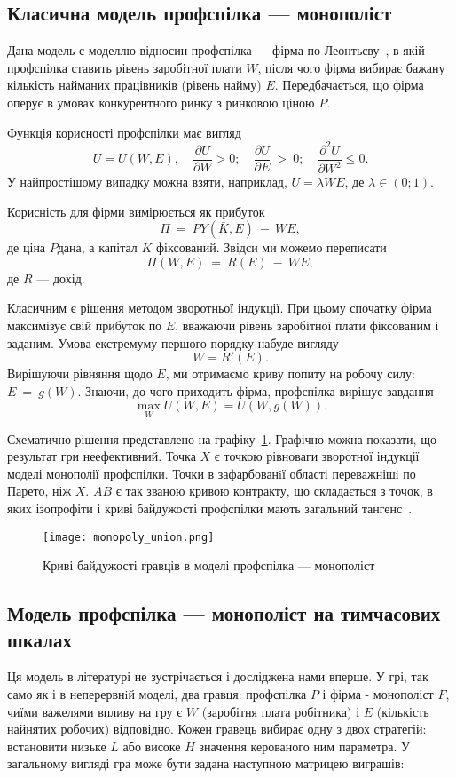 \subsection{Класична модель профспілка --- монополіст}
\label{sec:monopoly}

Дана модель є моделлю відносин профспілка --- фірма по
Леонтьєву~\cite{LeontiefW}, в якій профспілка ставить рівень заробітної плати $ W $,
після чого фірма вибирає бажану кількість найманих працівників (рівень
найму) $ E $. Передбачається, що фірма оперує в умовах конкурентного ринку з
ринковою ціною $ P $.

Функція корисності профспілки має вигляд
$$ 
	U = U(W,E), 
	\quad 
		\frac{\partial U}{\partial W} > 0; 
	\quad 
		\frac{\partial U}{\partial E}~>~0;
	\quad   
		\frac{\partial^2 U}{\partial W^2} \leqslant 0.
$$ 
У найпростішому випадку можна взяти, наприклад, $U = \lambda WE$, де $\lambda \in (0; 1)$.

Корисність для фірми вимірюється як прибуток
$$
	\Pi~=~PY(\bar K,E)~-~WE,
$$ 
де ціна $P$дана, а капітал $\bar K$ фіксований. Звідси ми можемо переписати 
$$
	\Pi(W,E)~=~R(E)~-~WE,
$$ 
де $R$ --- дохід.

Класичним є рішення методом зворотньої індукції.
При цьому спочатку фірма максимізує свій прибуток по $ E $, вважаючи рівень
заробітної плати фіксованим і заданим. Умова екстремуму першого порядку набуде вигляду
$$ 
	W = R'(E).
$$
Вирішуючи рівняння щодо $ E $, ми отримаємо криву попиту на робочу силу: $E~=~g(W)$.
Знаючи, до чого приходить фірма, профспілка вирішує завдання
$$ 
	\max_W U(W,E) = U(W, g(W)).
$$

Схематично рішення представлено на графіку~\ref{fig:monopoly_union}.
Графічно можна показати, що результат гри неефективний. Точка $ X $ є
точкою рівноваги зворотної індукції моделі монополії профспілки. Точки в
зафарбованiї області переважнішi по Парето, ніж $ X $. $ AB $ є так званою
кривою контракту, що складається з точок, в яких ізопрофіти і криві байдужості
профспілки мають загальний тангенс~\cite{ShandongUniver}.


\begin{figure}[h]
	\centering
	\texttt{[image: monopoly\_union.png]}
	\caption{Криві байдужості гравців в моделі профспілка --- монополіст}
	\label{fig:monopoly_union}
\end{figure}

\subsection{Модель профспілка --- монополіст на тимчасових шкалах}
Ця модель в літературі не зустрічається і досліджена нами вперше.
У грі, так само як і в неперервнiй моделі, два гравця: профспілка $ P $ і фірма - монополіст
$ F $, чиїми важелями впливу на гру є $ W $ (заробітня плата робітника) і $ E $
(кількість найнятих робочих) відповідно. Кожен гравець вибирає одну з двох
стратегій: встановити низьке $ L $ або високе $ H $ значення керованого ним параметра.
У загальному вигляді гра може бути задана наступною матрицею виграшів:

